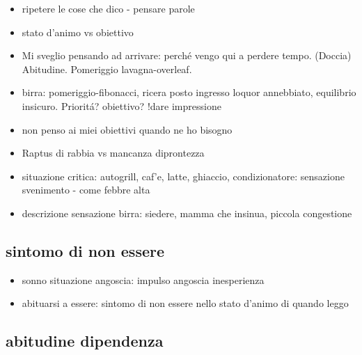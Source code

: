 \begin{itemize}

\item ripetere le cose che dico - pensare parole

\item stato d'animo vs obiettivo

\item Mi sveglio pensando ad arrivare: perch\'e vengo qui a perdere tempo. (Doccia) Abitudine. Pomeriggio lavagna-overleaf.

\item birra: pomeriggio-fibonacci, ricera posto ingresso loquor annebbiato, equilibrio insicuro. Priorit\'a? obiettivo? !dare impressione

\item non penso ai miei obiettivi quando ne ho bisogno

\item Raptus di rabbia vs mancanza diprontezza

\item situazione critica: autogrill, caf'e, latte, ghiaccio, condizionatore: sensazione svenimento - come febbre alta

\item descrizione sensazione birra: siedere, mamma che insinua, piccola congestione

\end{itemize}

\subsection{sintomo di non essere}

\begin{itemize}

\item sonno situazione angoscia: impulso angoscia inesperienza

\item abituarsi a essere: sintomo di non essere nello stato d'animo di quando leggo

\end{itemize}

\subsection{abitudine dipendenza}

